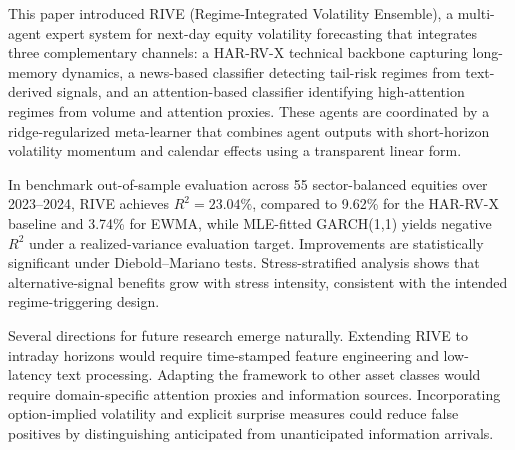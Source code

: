 \documentclass[review]{elsarticle}
\begin{document}
This paper introduced RIVE (Regime-Integrated Volatility Ensemble), a multi-agent expert system for next-day equity volatility forecasting that integrates three complementary channels: a HAR-RV-X technical backbone capturing long-memory dynamics, a news-based classifier detecting tail-risk regimes from text-derived signals, and an attention-based classifier identifying high-attention regimes from volume and attention proxies. These agents are coordinated by a ridge-regularized meta-learner that combines agent outputs with short-horizon volatility momentum and calendar effects using a transparent linear form.

In benchmark out-of-sample evaluation across 55 sector-balanced equities over 2023--2024, RIVE achieves $R^2 = 23.04\%$, compared to 9.62\% for the HAR-RV-X baseline and 3.74\% for EWMA, while MLE-fitted GARCH(1,1) yields negative $R^2$ under a realized-variance evaluation target. Improvements are statistically significant under Diebold--Mariano tests. Stress-stratified analysis shows that alternative-signal benefits grow with stress intensity, consistent with the intended regime-triggering design.

Several directions for future research emerge naturally. Extending RIVE to intraday horizons would require time-stamped feature engineering and low-latency text processing. Adapting the framework to other asset classes would require domain-specific attention proxies and information sources. Incorporating option-implied volatility and explicit surprise measures could reduce false positives by distinguishing anticipated from unanticipated information arrivals.
\end{document}
